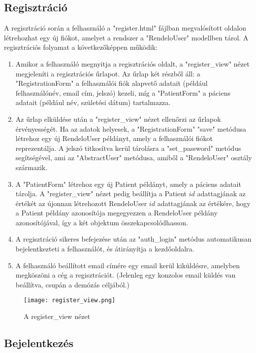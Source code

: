 \subsection{Regisztráció}

A regisztráció során a felhasználó a "register.html" fájlban megvalósított oldalon létrehozhat egy új fiókot, amelyet a rendszer a "RendeloUser" modellben tárol. A regisztrációs folyamat a következőképpen működik:

\begin{enumerate}
	\item Amikor a felhasználó megnyitja a regisztrációs oldalt, a "register\_view" nézet megjeleníti a regisztrációs űrlapot. Az űrlap két részből áll: a "RegistrationForm" a felhasználói fiók alapvető adatait (például felhasználónév, email cím, jelszó) kezeli, míg a "PatientForm" a páciens adatait (például név, születési dátum) tartalmazza.
	\item Az űrlap elküldése után a "register\_view" nézet ellenőrzi az űrlapok érvényességét. Ha az adatok helyesek, a "RegistrationForm" "save" metódusa létrehoz egy új RendeloUser példányt, amely a felhasználói fiókot reprezentálja. A jelszó titkosítva kerül tárolásra a "set\_password" metódus segítségével, ami az "AbstractUser" metódusa, amiből a "RendeloUser" osztály származik.
	\item A "PatientForm" létrehoz egy új Patient példányt, amely a páciens adatait tárolja. A "register\_view" nézet pedig beállítja a Patient $id$ adattagjának az értékét az újonnan létrehozott RendeloUser $id$ adattagjának az értékére, hogy a Patient példány azonosítója megegyezzen a RendeloUser példány azonosítójával, így a két objektum összekapcsolódhasson.
	\item A regisztráció sikeres befejezése után az "auth\_login" metódus automatikusan bejelentkezteti a felhasználót, és átirányítja a kezdőoldalra.
	\item A felhasználó beállított email címére egy email kerül kiküldésre, amelyben megköszöni a cég a regisztrációt. (Jelenleg egy konzolos email küldés van beállítva, csupán a demózás céljából.)
\end{enumerate}

\begin{figure}[H]
	\caption{A register\_view nézet}
	\label{fig:registerview}
	\centering
	\texttt{[image: register\_view.png]}
\end{figure}

\subsection{Bejelentkezés}

